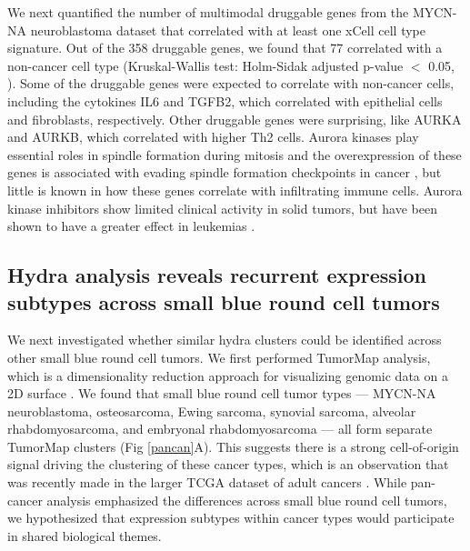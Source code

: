 \documentclass[10pt,letterpaper]{article}
\begin{document}
We next quantified the number of multimodal druggable genes from the MYCN-NA neuroblastoma dataset that correlated with at least one xCell cell type signature. Out of the 358 druggable genes, we found that 77 correlated with a non-cancer cell type (Kruskal-Wallis test: Holm-Sidak adjusted p-value $<$ 0.05, ). Some of the druggable genes were expected to correlate with non-cancer cells, including the cytokines IL6 and TGFB2, which correlated with epithelial cells and fibroblasts, respectively. Other druggable genes were surprising, like AURKA and AURKB, which correlated with higher Th2 cells. Aurora kinases play essential roles in spindle formation during mitosis and the overexpression of these genes is associated with evading spindle formation checkpoints in cancer \cite{marisInitialTestingAurora2010}, but little is known in how these genes correlate with infiltrating immune cells. Aurora kinase inhibitors show limited clinical activity in solid tumors, but have been shown to have a greater effect in leukemias \cite{marisInitialTestingAurora2010,gautschiAuroraKinasesAnticancer2008}.

\subsection*{Hydra analysis reveals recurrent expression subtypes across small blue round cell tumors}
We next investigated whether similar hydra clusters could be identified across other small blue round cell tumors. We first performed TumorMap analysis, which is a dimensionality reduction approach for visualizing genomic data on a 2D surface \cite{newtonTumorMapExploringMolecular2017}. We found that small blue round cell tumor types --- MYCN-NA neuroblastoma, osteosarcoma, Ewing sarcoma, synovial sarcoma, alveolar rhabdomyosarcoma, and embryonal rhabdomyosarcoma --- all form separate TumorMap clusters (Fig \ref{pancan}A). This suggests there is a strong cell-of-origin signal driving the clustering of these cancer types, which is an observation that was recently made in the larger TCGA dataset of adult cancers \cite{hoadleyCellofOriginPatternsDominate2018}. While pan-cancer analysis emphasized the differences across small blue round cell tumors, we hypothesized that expression subtypes within cancer types would participate in shared biological themes.
\end{document}

